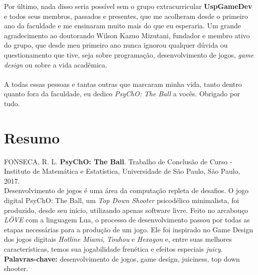 Por último, nada disso seria possível sem o grupo extracurricular \textbf{UspGameDev} e todos seus membros, passados e presentes, que me acolheram desde o primeiro ano da faculdade e me ensinaram muito mais do que eu esperaria. Um grande agradecimento ao doutorando Wilson Kazuo Mizutani, fundador e membro ativo do grupo, que desde meu primeiro ano nunca ignorou qualquer dúvida ou questionamento que tive, seja sobre programação, desenvolvimento de jogos, \textit{game design} ou sobre a vida acadêmica.\\\\

A todas essas pessoas e tantas outras que marcaram minha vida, tanto dentro quanto fora da faculdade, eu dedico \textit{PsyChO: The Ball} a vocês. Obrigado por tudo.

\chapter*{Resumo}

\noindent%
FONSECA, R. L. \textbf{PsyChO: The Ball}. Trabalho de Conclusão de Curso
 - Instituto de Matemática e Estatística, Universidade de São Paulo,
São Paulo, 2017.
\\

Desenvolvimento de jogos é uma área da computação repleta de desafios. O jogo digital PsyChO: The Ball, um \textit{Top Down Shooter} psicodélico minimalista, foi produzido, desde seu início, utilizando apenas software livre. Feito no arcabouço \textit{LÖVE} com a linguagem Lua, o processo de desenvolvimento passou por todas as etapas necessárias para a produção de um jogo. Ele foi inspirado no Game Design dos jogos digitais \textit{Hotline Miami}, \textit{Touhou} e \textit{Hexagon} e, entre suas melhores características, temos sua jogabilidade frenética e efeitos especiais \textit{juicy}.
\\

\noindent%
\textbf{Palavras-chave:} desenvolvimento de jogos, game design, juiciness, top down shooter.
